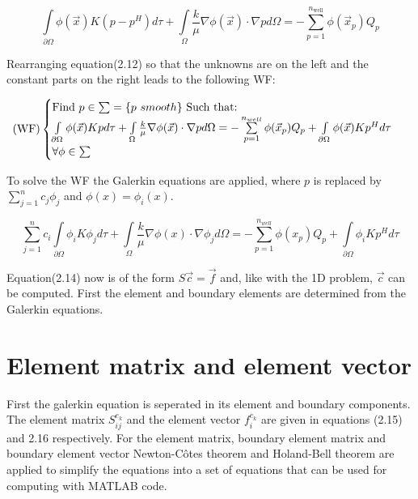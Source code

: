 \documentclass[a4paper]{report}
\begin{document}
\begin{equation}
	\int\limits_{\partial\Omega}\phi(\vec{x})K(p-p^H) d\tau+\int\limits_{\Omega}\frac{k}{\mu}\nabla\phi(\vec{x})\cdot\nabla p d\Omega= -\sum_{p=1}^{n_{\text{well}}}\phi(\vec{x}_p) Q_p
\end{equation}	

Rearranging equation(2.12) so that the unknowns are on the left and the constant parts on the right leads to the following WF:
\vspace{1mm}

 \begin{equation}
 \text{(WF)}
		\begin{cases} 
			$Find $p \in \sum =\{p$ $ smooth\}$ Such that:$ \\
			\int\limits_{\partial\Omega}\phi(\vec{x})Kp d\tau+\int\limits_{\Omega}\frac{k}{\mu}\nabla\phi(\vec{x})\cdot\nabla p d\Omega= -\sum\limits_{p=1}^{n_{well}}\phi(\vec{x}_p) Q_p +\int\limits_{\partial\Omega}\phi(\vec{x})Kp^Hd\tau\\ \forall\phi \in \sum 
		\end{cases}\  
\end{equation}
\vspace{1mm}

To solve the WF the Galerkin equations are applied, where $p$ is replaced by $ \sum\limits_{j=1}^{n}c_j\phi_j $ and  $\phi(x)=\phi_i(x)$.

\begin{equation}
	\sum\limits_{j=1}^{n}c_i\int\limits_{\partial\Omega}\phi_i K\phi_j d\tau + \int\limits_{\Omega}\frac{k}{\mu}\nabla\phi(x)\cdot\nabla \phi_j d\Omega= -\sum\limits_{p=1}^{n_{well}}\phi(x_p) Q_p +\int\limits_{\partial\Omega}\phi_i Kp^Hd\tau
\end{equation}

Equation(2.14) now is of the form $S\vec{c}=\vec{f}$ and, like with the 1D problem,  $\vec{c}$ can be computed. First the element and boundary elements are determined from the Galerkin equations.


\section{Element matrix and element vector}

First the galerkin equation is seperated in its element and boundary components. The element matrix $S^{e_k}_{ij}$ and the element vector $f^{e_k}_i$ are given in equations (2.15) and 2.16 respectively. For the element matrix, boundary element matrix and boundary element vector Newton-Côtes theorem and Holand-Bell theorem are applied to simplify the equations into a set of equations that can be used for computing with MATLAB code.
\end{document}
